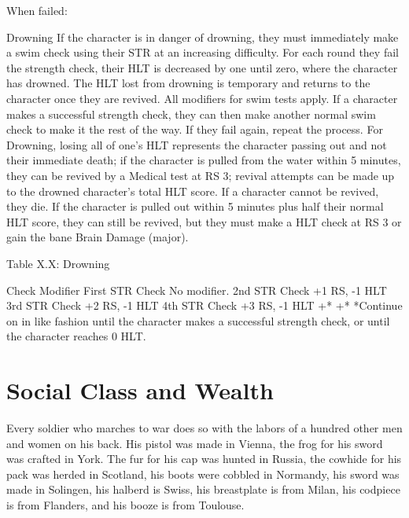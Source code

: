 \documentclass[oneside,11pt,english]{book}
\begin{document}
 

When failed: 

 


Drowning 
If the character is in danger of drowning, they must immediately make a swim check using their STR at 
an increasing difficulty. For each round they fail the strength check, their HLT is decreased by one until 
zero, where the character has drowned. The HLT lost from drowning is temporary and returns to the 
character once they are revived. All modifiers for swim tests apply. If a character makes a successful 
strength check, they can then make another normal swim check to make it the rest of the way. If they fail 
again, repeat the process. For Drowning, losing all of one’s HLT represents the character passing out and 
not their immediate death; if the character is pulled from the water within 5 minutes, they can be revived 
by a Medical test at RS 3; revival attempts can be made up to the drowned character’s total HLT score. If 
a character cannot be revived, they die. If the character is pulled out within 5 minutes plus half their 
normal HLT score, they can still be revived, but they must make a HLT check at RS 3 or gain the bane 
Brain Damage (major). 

 

Table X.X: Drowning 

 

Check Modifier 
First STR Check No modifier. 
2nd STR Check +1 RS, -1 HLT 
3rd STR Check +2 RS, -1 HLT 
4th STR Check +3 RS, -1 HLT 
+* +* 
*Continue on in like fashion until the character makes a successful strength check, or until the character 
reaches 0 HLT. 

 

\chapter{Social Class and Wealth}\label{ch:wealth}

 

 
Every soldier who marches to war does so with the labors of a hundred other men and women on his 
back. His pistol was made in Vienna, the frog for his sword was crafted in York. The fur for his cap was 
hunted in Russia, the cowhide for his pack was herded in Scotland, his boots were cobbled in Normandy, 
his sword was made in Solingen, his halberd is Swiss, his breastplate is from Milan, his codpiece is from 
Flanders, and his booze is from Toulouse. 

 
\end{document}
